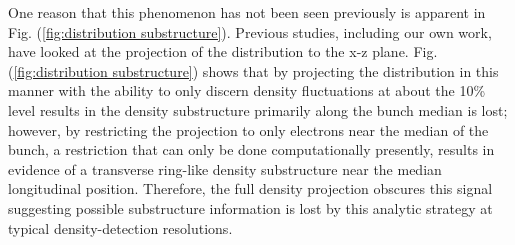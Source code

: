 \documentclass[aps,prl,twocolumn,showpacs,superscriptaddress,groupedaddress]{revtex4-1}  %
\begin{document}
{One reason that this phenomenon has not been seen previously 
is apparent in Fig. (\ref{fig:distribution substructure}).  Previous studies, including our own work,
have looked at the projection of the distribution to the x-z plane\cite{Luiten:2004_uniform_ellipsoidal,Musucemi:2008_generate_uniform_ellipsoid,Portman:2014_image_charge,Morrison:2013_measurement,Li:2008_quasiellipsoidal}. 
Fig. (\ref{fig:distribution substructure})
shows that by projecting the distribution in this manner with the ability to only discern
density fluctuations at about the 10\% level results in the density substructure primarily along the bunch
median is lost; however,
by restricting the projection to only electrons near the median of the bunch, a restriction that can only
be done computationally presently, results in evidence of a transverse ring-like density substructure near the median longitudinal 
position.  Therefore, the full density projection obscures this signal suggesting possible substructure information is lost 
by this analytic strategy at typical density-detection resolutions.  

}
\end{document}
